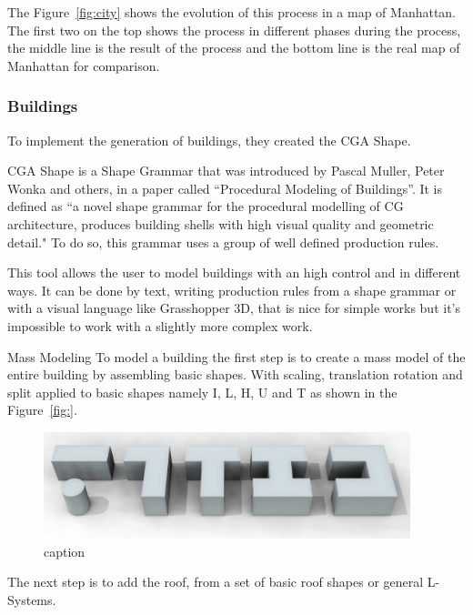 The Figure~\ref{fig:city} shows the evolution of this process in a map of Manhattan. The first two on the top shows the process in different phases during the process, the middle line is the result of the process and the bottom line is the real map of Manhattan for comparison.


\subsubsection{Buildings} %
\label{ssub:buildings1}

To implement the generation of buildings, they created the CGA Shape.

CGA Shape is a Shape Grammar that was introduced by Pascal Muller, Peter Wonka and others, in a paper called ``Procedural Modeling of Buildings''\cite{Parish2001}. It is defined as ``a novel shape grammar for the procedural modelling of CG architecture, produces building shells with high visual quality and geometric detail." To do so, this grammar uses a group of well defined production rules.

This tool allows the user to model buildings with an high control and in different ways. It can be done by text, writing production rules from a shape grammar or with a visual language like Grasshopper 3D, that is nice for simple works but it's impossible to work with a slightly more complex work. 

Mass Modeling
To model a building the first step is to create a mass model of the entire building by assembling basic shapes. With scaling, translation rotation and split applied to basic shapes namely I, L, H, U and T as shown in the Figure~\ref{fig:}.

\begin{figure}[htbp]
  \centering
  \includegraphics[width=0.95\textwidth]{img/Procedural-Modeling-of-Cities/MassModeling2.png}
  \caption{caption}
  \label{fig:label}
\end{figure}

The next step is to add the roof, from a set of basic roof shapes or general L-Systems.


